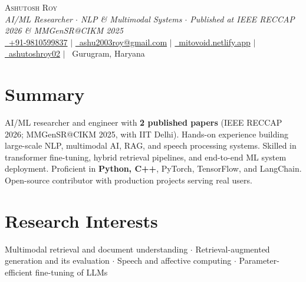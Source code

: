 \documentclass[letterpaper,10.5pt]{article}
\begin{document}
\begin{center}
    {\Huge \scshape \color{greenTheme} Ashutosh Roy} \\[5pt]
    {\large \textit{AI/ML Researcher $\cdot$ NLP \& Multimodal Systems $\cdot$ Published at IEEE RECCAP 2026 \& MMGenSR@CIKM 2025}} \\[5pt]
      \small
    \href{tel:+919810599837}{\faPhone\ +91-9810599837}  \hspace{4pt}$|$\hspace{4pt}
    \href{mailto:ashu2003roy@gmail.com}{\faEnvelope\ ashu2003roy@gmail.com} \hspace{4pt}$|$\hspace{4pt}
    \href{https://mitovoid.netlify.app}{\faGlobe\ mitovoid.netlify.app} \hspace{4pt}$|$\hspace{4pt}
    \href{https://github.com/ashutoshroy02}{\faGithub\ ashutoshroy02} \hspace{4pt}$|$\hspace{4pt}
    \faMapMarker\ Gurugram, Haryana
\end{center}
\vspace{-8pt}

\section{Summary}
\vspace{2pt}
\small{AI/ML researcher and engineer with \textbf{2 published papers} (IEEE RECCAP 2026; MMGenSR@CIKM 2025, with IIT Delhi). Hands-on experience building large-scale NLP, multimodal AI, RAG, and speech processing systems. Skilled in transformer fine-tuning, hybrid retrieval pipelines, and end-to-end ML system deployment. Proficient in \textbf{Python, C++}, PyTorch, TensorFlow, and LangChain. Open-source contributor with production projects serving real users.
}
\vspace{-4pt}

\section{Research Interests}
\vspace{2pt}
\small{Multimodal retrieval and document understanding $\cdot$ Retrieval-augmented generation and its evaluation $\cdot$ Speech and affective computing $\cdot$ Parameter-efficient fine-tuning of LLMs}
\vspace{-4pt}
\end{document}
